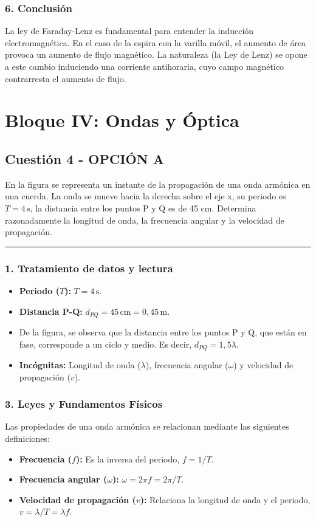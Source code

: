 \subsubsection*{6. Conclusión}
\begin{cajaconclusion}
La ley de Faraday-Lenz es fundamental para entender la inducción electromagnética. En el caso de la espira con la varilla móvil, el aumento de área provoca un aumento de flujo magnético. La naturaleza (la Ley de Lenz) se opone a este cambio induciendo una corriente antihoraria, cuyo campo magnético contrarresta el aumento de flujo.
\end{cajaconclusion}
\newpage

\section{Bloque IV: Ondas y Óptica}
\label{sec:ondasopt_2019_jun_ord}

\subsection{Cuestión 4 - OPCIÓN A}
\label{subsec:4A_2019_jun_ord}
\begin{cajaenunciado}
En la figura se representa un instante de la propagación de una onda armónica en una cuerda. La onda se mueve hacia la derecha sobre el eje x, su periodo es $T=4\,\text{s}$, la distancia entre los puntos P y Q es de 45 cm. Determina razonadamente la longitud de onda, la frecuencia angular y la velocidad de propagación.
\end{cajaenunciado}
\hrule
\subsubsection*{1. Tratamiento de datos y lectura}
\begin{itemize}
    \item \textbf{Periodo ($T$):} $T = 4\,\text{s}$.
    \item \textbf{Distancia P-Q:} $d_{PQ} = 45\,\text{cm} = 0,45\,\text{m}$.
    \item De la figura, se observa que la distancia entre los puntos P y Q, que están en fase, corresponde a un ciclo y medio. Es decir, $d_{PQ} = 1,5 \lambda$.
    \item \textbf{Incógnitas:} Longitud de onda ($\lambda$), frecuencia angular ($\omega$) y velocidad de propagación ($v$).
\end{itemize}
\subsubsection*{3. Leyes y Fundamentos Físicos}
Las propiedades de una onda armónica se relacionan mediante las siguientes definiciones:
\begin{itemize}
    \item \textbf{Frecuencia ($f$):} Es la inversa del periodo, $f=1/T$.
    \item \textbf{Frecuencia angular ($\omega$):} $\omega = 2\pi f = 2\pi/T$.
    \item \textbf{Velocidad de propagación ($v$):} Relaciona la longitud de onda y el periodo, $v = \lambda/T = \lambda f$.
\end{itemize}
